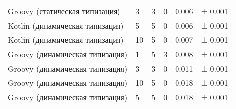 \begin{table}[h]
\begin{center}
\begin{tabular}{|l|p{}|p{}|p{}|p{}|l|}
Groovy (статическая типизация)  & 3 & 3 & 0                 & 0.006 & ±  0.001 \\
Kotlin (динамическая типизация) & 5 & 5 & 0                 & 0.006 & ±  0.001 \\
Kotlin (динамическая типизация) & 10 & 5 & 0                & 0.007 & ±  0.001 \\
Groovy (динамическая типизация) & 1 & 5 & 3                 & 0.008 & ±  0.001 \\
Groovy (динамическая типизация) & 3 & 3 & 0                 & 0.011 & ±  0.001 \\
Groovy (динамическая типизация) & 10 & 5 & 0                & 0.018 & ±  0.001 \\
Groovy (динамическая типизация) & 5 & 5 & 0                 & 0.018 & ±  0.001 \\
\hline
\end{tabular}
\end{center}
\end{table} 



